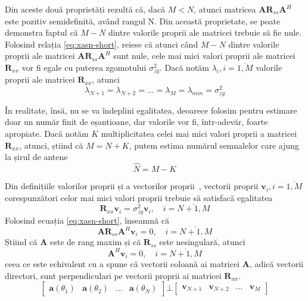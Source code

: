 Din aceste două proprietăți rezultă că, dacă $M < N$, atunci matricea
$\bm{A}\bm{R}_{ss}\bm{A}^H$ este pozitiv semidefinită, având rangul N. Din
această proprietate, se poate demonstra faptul că $M - N$ dintre valorile
proprii ale matricei trebuie să fie nule. Folosind relația
\eqref{eq:xasn-short}, reiese că atunci când $M - N$ dintre valorile proprii ale
matricei $\bm{A}\bm{R}_{ss}\bm{A}^H$ sunt nule, cele mai mici valori proprii ale
matricei $\bm{R}_{xx}$ vor fi egale cu puterea zgomotului $\sigma_{zg}^2$. Dacă
notăm $\lambda_i, i = \overline{1, M}$ valorile proprii ale matricei
$\bm{R}_{xx}$, atunci
\begin{equation}
    \lambda_{N+1} = \lambda_{N+2} = ... = \lambda_M = \lambda_{min} = \sigma_{zg}^2
\end{equation}

În realitate, însă, nu se va îndeplini egalitatea, deoarece folosim
pentru estimare doar un număr finit de eșantioane, dar valorile vor fi,
într-adevăr, foarte apropiate. Dacă notăm $K$ multiplicitatea celei mai mici
valori proprii a matricei $\bm{R}_{xx}$, atunci, știind că $M = N + K$, putem
estima numărul semnalelor care ajung la șirul de antene
\begin{equation}
    \hat{N} = M - K
\end{equation}

Din definițiile valorilor proprii și a vectorilor proprii~\cite{gol-matrix}, vectorii
proprii $\bm{v}_i, i = \overline{1, M}$ corespunzători celor mai mici valori
proprii trebuie să satisfacă egalitatea
\begin{equation}
    \bm{R}_{xx}\bm{v}_i = \sigma_{zg}^2\bm{v}_i, \quad i = \overline{N+1, M}
\end{equation}
Folosind ecuația \eqref{eq:xasn-short}, înseamnă că
\begin{equation}
    \bm{A}\bm{R}_{ss}\bm{A}^H\bm{v}_i = 0, \quad i = \overline{N+1, M}
\end{equation}
Știind că $\bm{A}$ este de rang maxim și că $\bm{R}_{ss}$ este nesingulară,
atunci
\begin{equation}
    \bm{A}^H\bm{v}_i = 0, \quad i = \overline{N+1, M}
\end{equation}
ceea ce este echivalent cu a spune că vectorii coloană ai matricei $\bm{A}$,
adică vectorii directori, sunt perpendiculari pe vectorii proprii ai matricei
$\bm{R}_{xx}$. 
\begin{equation}
    \begin{bmatrix}
	\bm{a}(\theta_1) & \bm{a}(\theta_2) & ... & \bm{a}(\theta_N)
    \end{bmatrix}
    \bot
    \begin{bmatrix}
	\bm{v}_{N+1} & \bm{v}_{N+2} & ... & \bm{v}_M
    \end{bmatrix}
\end{equation}

